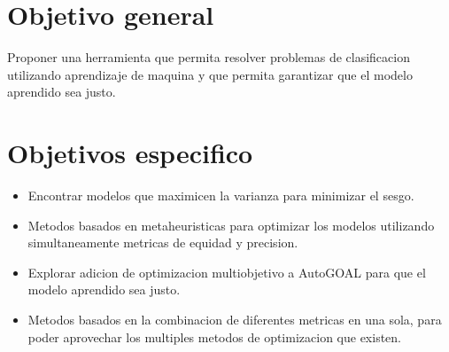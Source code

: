 \section*{Objetivo general}

Proponer una herramienta que permita resolver problemas de clasificacion utilizando aprendizaje de maquina y que permita garantizar que el modelo aprendido sea justo.

\section*{Objetivos especifico}

\begin{itemize}
    \item Encontrar modelos que maximicen la varianza para minimizar el sesgo.
    \item Metodos basados en metaheuristicas para optimizar los modelos utilizando simultaneamente metricas de equidad y precision.
    \item Explorar adicion de optimizacion multiobjetivo a AutoGOAL para que el modelo aprendido sea justo.
    \item Metodos basados en la combinacion de diferentes metricas en una sola, para poder aprovechar los multiples metodos de optimizacion que existen.
\end{itemize}
